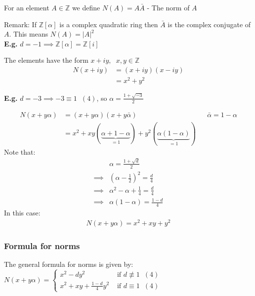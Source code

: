 \documentclass[11pt]{article}
\begin{document}
\begin{definition}
	For an element $A \in \mathbb{Z}$ we define $N(A) = A \bar A$ - The norm of $A$
\end{definition}
Remark: If $\mathbb{Z}[\alpha]$ is a complex quadratic ring then $\bar A$ is the complex conjugate of $A$. This means $N(A) = |A|^2$\\[1em]


\textbf{E.g.} $d = -1 \implies \mathbb{Z}[\alpha] = \mathbb{Z}[i]$

The elements have the form $x+iy , \hspace{7pt} x, y \in \mathbb{Z}$
\begin{align*}
	N(x+iy) &= (x+iy)(x-iy) \\
	&= x^2 + y^2
\end{align*}


\textbf{E.g.} $d=-3 \implies -3 \equiv 1 \hspace{7pt} (4) $, so $\alpha = \frac{1+\sqrt{-3}}{2}$

\begin{align*}
	N(x+y\alpha) &= (x+y\alpha)(x+y\bar \alpha) && \bar \alpha = 1- \alpha\\
	&=x^2 + xy(\underbrace{\alpha+ 1-\alpha}_{=1}) + y^2(\underbrace{\alpha(1-\alpha)}_{=1})
\end{align*}
Note that:
\begin{align*}
	&\alpha = \frac{1+\sqrt{d}}{2}\\[1em]
	\implies &(\alpha - \frac{1}{2})^2 = \frac{d}{4}\\[1em]
	\implies &\alpha^2 - \alpha + \frac{1}{4}  =  \frac{d}{4}\\[1em]
	\implies & \alpha(1-\alpha) = \frac{1-d}{4}
\end{align*}
In this case:
\begin{align*}
	N(x+y\alpha) = x^2 + xy+y^2
\end{align*}


\subsubsection{Formula for norms}
The general formula for norms is given by: \\[1em]
$
N(x+y\alpha) = 
\begin{cases}
	x^2 - dy^2 & \text{ if } d\not \equiv 1 \hspace{7pt} (4)\\
	x^2 + xy + \frac{1-d}{4}y^2 &\text{ if } d \equiv 1 \hspace{7pt} (4)
\end{cases}
$
\end{document}
